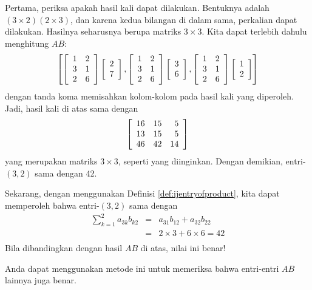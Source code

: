 \begin{solution} Pertama, periksa apakah hasil kali dapat dilakukan. Bentuknya adalah $\left( 3\times
2\right) \left( 2\times 3\right) $, dan karena kedua bilangan di dalam sama, perkalian dapat dilakukan. Hasilnya seharusnya berupa matriks $3\times 3$.
Kita dapat terlebih dahulu menghitung $AB$:
\begin{equation*}
\left[ \left[
\begin{array}{rr}
1 & 2 \\
3 & 1 \\
2 & 6
\end{array}
\right] \left[
\begin{array}{r}
2 \\
7
\end{array}
\right] ,\left[
\begin{array}{rr}
1 & 2 \\
3 & 1 \\
2 & 6
\end{array}
\right] \left[
\begin{array}{r}
3 \\
6
\end{array}
\right] ,\left[
\begin{array}{rr}
1 & 2 \\
3 & 1 \\
2 & 6
\end{array}
\right] \left[
\begin{array}{r}
1 \\
2
\end{array}
\right] \right]
\end{equation*}
dengan tanda koma memisahkan kolom-kolom pada hasil kali yang diperoleh. Jadi,
hasil kali di atas sama dengan
\begin{equation*}
 \left[
\begin{array}{rrr}
16 & 15 & 5 \\
13 & 15 & 5 \\
46 & 42 & 14
\end{array}
\right] 
\end{equation*}
yang merupakan matriks $3\times 3$, seperti yang diinginkan. Dengan demikian, entri-$\left( 3,2 \right)$ sama dengan 42.

Sekarang, dengan menggunakan Definisi
\ref{def:ijentryofproduct}, kita dapat memperoleh bahwa entri-$\left( 3,2 \right)$ sama dengan
\begin{eqnarray*}
\sum_{k=1}^{2}a_{3k}b_{k2} &=&a_{31}b_{12}+a_{32}b_{22} \\
&=&2\times 3+6\times 6=42\\
\end{eqnarray*}
Bila dibandingkan dengan hasil $AB$ di atas, nilai ini benar! 

Anda dapat menggunakan metode ini untuk memeriksa bahwa entri-entri $AB$ lainnya juga benar.
\end{solution}

